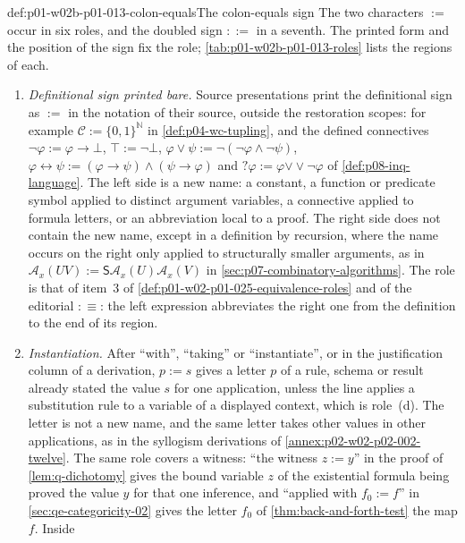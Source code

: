 \begin{hbconvention}{def:p01-w02b-p01-013-colon-equals}{The colon-equals sign}
The two characters \(:=\) occur in six roles, and the doubled sign \(::=\)
in a seventh.  The printed form and the position of the sign fix the role;
\cref{tab:p01-w02b-p01-013-roles} lists the regions of each.
\begin{enumerate}
  \item[(a)] \emph{Definitional sign printed bare.}  Source presentations
  print the definitional sign as \(:=\) in the notation of their source,
  outside the restoration scopes: for example
  \(\mathcal C:=\{0,1\}^{\mathbb N}\) in \cref{def:p04-wc-tupling}, and the
  defined connectives \(\neg\varphi:=\varphi\to\bot\), \(\top:=\neg\bot\),
  \(\varphi\lor\psi:=\neg(\neg\varphi\land\neg\psi)\),
  \(\varphi\leftrightarrow\psi:=(\varphi\to\psi)\land(\psi\to\varphi)\) and
  \(?\varphi:=\varphi\mathbin{\vee\!\vee}\neg\varphi\) of
  \cref{def:p08-inq-language}.  The left side is a new name: a constant, a
  function or predicate symbol applied to distinct argument variables, a
  connective applied to formula letters, or an abbreviation local to a
  proof.  The right side does not contain the new name, except in a
  definition by recursion, where the name occurs on the right only applied to
  structurally smaller arguments, as in
  \(\mathcal A_x(UV):=\mathsf S\mathcal A_x(U)\mathcal A_x(V)\) in
  \cref{sec:p07-combinatory-algorithms}.  The role is that of item~3 of
  \cref{def:p01-w02-p01-025-equivalence-roles} and of the editorial
  \(\mathrel{:\equiv}\): the left expression abbreviates the right one from
  the definition to the end of its region.
  \item[(b)] \emph{Instantiation.}  After ``with'', ``taking'' or
  ``instantiate'', or in the justification column of a derivation,
  \(p:=s\) gives a letter \(p\) of a rule, schema or result already stated the
  value \(s\) for one application, unless the line applies a substitution
  rule to a variable of a displayed context, which is role~(d).  The letter is not a new name, and the
  same letter takes other values in other applications, as in the
  syllogism derivations of \cref{annex:p02-w02-p02-002-twelve}.  The
  same role covers a witness: ``the witness \(z:=y\)'' in the proof of
  \cref{lem:q-dichotomy} gives the bound variable \(z\) of the existential
  formula being proved the value \(y\) for that one inference, and
  ``applied with \(f_0:=f\)'' in \cref{sec:qe-categoricity-02} gives the
  letter \(f_0\) of \cref{thm:back-and-forth-test} the map \(f\).  Inside

\end{enumerate}
\end{hbconvention}
